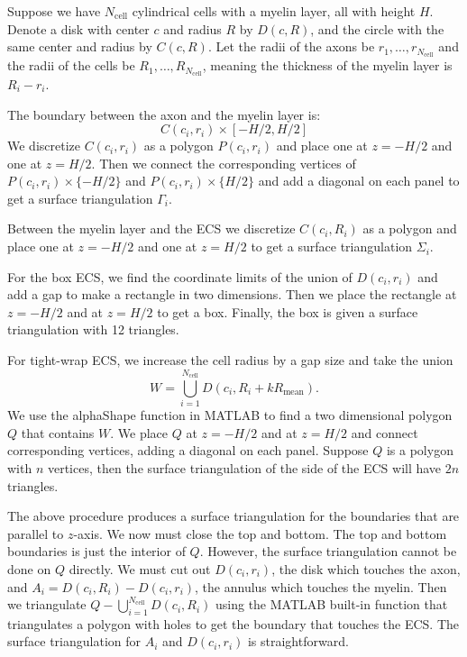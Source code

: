 Suppose we have $N_\text{cell}$ cylindrical cells with a myelin layer, all with height $H$. Denote a disk with center $c$ and radius $R$ by $D(c, R)$, and the circle with the same center and radius by $C(c, R)$. Let the radii of the axons be $r_1, \dots, r_{N_\text{cell}}$ and the radii of the cells be $R_1, \dots, R_{N_\text{cell}}$, meaning the thickness of the myelin layer is $R_i - r_i$.

The boundary between the axon and the myelin layer is:
$$C(c_i,r_i)\times [-H/2,H/2]$$
We discretize $C(c_i,r_i)$ as a polygon $P(c_i,r_i)$ and place one at $z = -H/2$ and one at $z = H/2$. Then we connect the corresponding vertices of $P(c_i,r_i)\times\{-H/2\}$ and $P(c_i,r_i)\times\{H/2\}$ and add a diagonal on each panel to get a surface triangulation $\Gamma_i$.

Between the myelin layer and the ECS we discretize $C(c_i,R_i)$ as a polygon and place one at $z=-H/2$ and one at $z = H/2$ to get a surface triangulation $\Sigma_i$.

For the box ECS, we find the coordinate limits of the union of $D(c_i,r_i)$ and add a gap to make a rectangle in two dimensions. Then we place the rectangle at $z=-H/2$ and at $z=H/2$ to get a box. Finally, the box is given a surface triangulation with 12 triangles.

For tight-wrap ECS, we increase the cell radius by a gap size and take the union
$$W = \bigcup_{i=1}^{N_\text{cell}} D(c_i, R_i + k R_\text{mean}).$$
We use the alphaShape function in MATLAB to find a two dimensional polygon $Q$ that contains $W$. We place $Q$ at $z=-H/2$ and at $z=H/2$ and connect corresponding vertices, adding a diagonal on each panel. Suppose $Q$ is a polygon with $n$ vertices, then the surface triangulation of the side of the ECS will have $2n$ triangles.

The above procedure produces a surface triangulation for the boundaries that are parallel to $z$-axis. We now must close the top and bottom. The top and bottom boundaries is just the interior of $Q$. However, the surface triangulation cannot be done on $Q$ directly. We must cut out $D(c_i,r_i)$, the disk which touches the axon, and $A_i = D(c_i,R_i)-D(c_i,r_i)$, the annulus which touches the myelin. Then we triangulate $Q-\bigcup_{i=1}^{N_\text{cell}} D(c_i,R_i)$ using the MATLAB built-in function that triangulates a polygon with holes to get the boundary that touches the ECS. The surface triangulation for $A_i$ and $D(c_i,r_i)$ is straightforward.
